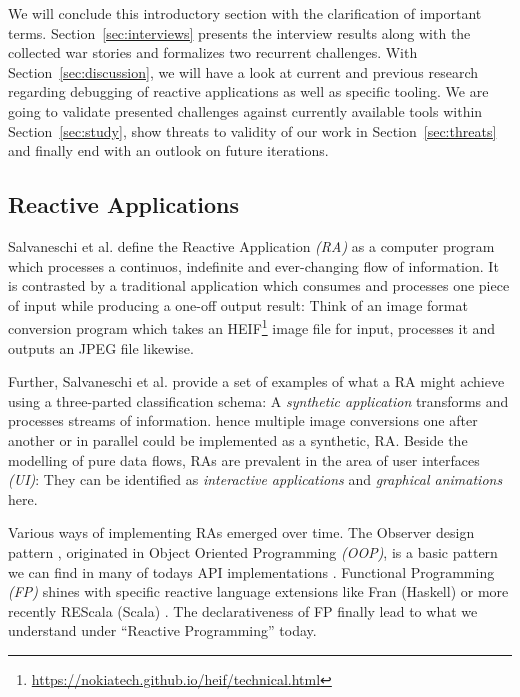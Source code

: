 \documentclass[12pt,a4paper]{article}
\begin{document}
We will conclude this introductory section with the clarification of important terms. Section~\ref{sec:interviews} presents the interview results along with the collected war stories and formalizes two recurrent challenges. With Section~\ref{sec:discussion}, we will have a look at current and previous research regarding debugging of reactive applications as well as specific tooling. We are going to validate presented challenges against currently available tools within Section~\ref{sec:study}, show threats to validity of our work in Section~\ref{sec:threats} and finally end with an outlook on future iterations.

\subsection{Reactive Applications}

Salvaneschi et al. \cite{7827078} define the Reactive Application \emph{(RA)} as a computer program which processes a continuos, indefinite and ever-changing flow of information. It is contrasted by a traditional application which consumes and processes one piece of input while producing a one-off output result: Think of an image format conversion program which takes an HEIF\footnote{\url{https://nokiatech.github.io/heif/technical.html}} image file for input, processes it and outputs an JPEG file likewise.

Further, Salvaneschi et al. provide a set of examples of what a RA might achieve using a three-parted classification schema: A \emph{synthetic application} transforms and processes streams of information. hence multiple image conversions one after another or in parallel could be implemented as a synthetic, RA. Beside the modelling of pure data flows, RAs are prevalent in the area of user interfaces \emph{(UI)}: They can be identified as \emph{interactive applications} and \emph{graphical animations} here.

Various ways of implementing RAs emerged over time. The Observer design pattern \cite{gamma1995design}, originated in Object Oriented Programming \emph{(OOP)}, is a basic pattern we can find in many of todays API implementations \cite{alabor:2019:reactiveappllications}. Functional Programming \emph{(FP)} shines with specific reactive language extensions like Fran (Haskell) \cite{10.1145/2501654.2501666} or more recently REScala (Scala) \cite{10.1145/2577080.2577083}. The declarativeness of FP finally lead to what we understand under ``Reactive Programming'' today.
\end{document}
